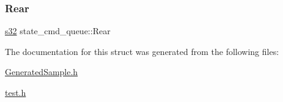\mbox{\label{structstate__cmd__queue_af93455ef4f59c05176a6bd70b07a1f10}} 
\subsubsection{\texorpdfstring{Rear}{Rear}}
{\footnotesize\ttfamily \hyperlink{ab__common_8h_ae9b1af5c037e57a98884758875d3a7c4}{s32} state\+\_\+cmd\+\_\+queue\+::\+Rear}



The documentation for this struct was generated from the following files\+:\begin{DoxyCompactItemize}
\item 
\hyperlink{GeneratedSample_8h}{Generated\+Sample.\+h}\item 
\hyperlink{test_8h}{test.\+h}\end{DoxyCompactItemize}
